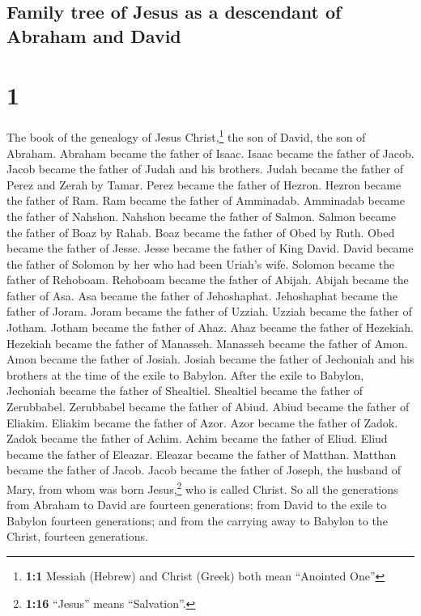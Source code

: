 \hypertarget{family-tree-of-jesus-as-a-descendant-of-abraham-and-david}{%
\subsection{Family tree of Jesus as a descendant of Abraham and
David}\label{family-tree-of-jesus-as-a-descendant-of-abraham-and-david}}

\hypertarget{section}{%
\section{1}\label{section}}

 The book of the genealogy of Jesus Christ,\footnote{\textbf{1:1}
  Messiah (Hebrew) and Christ (Greek) both mean ``Anointed One''} the
son of David, the son of Abraham.  Abraham became the
father of Isaac. Isaac became the father of Jacob. Jacob became the
father of Judah and his brothers.  Judah became the father
of Perez and Zerah by Tamar. Perez became the father of Hezron. Hezron
became the father of Ram.  Ram became the father of
Amminadab. Amminadab became the father of Nahshon. Nahshon became the
father of Salmon.  Salmon became the father of Boaz by
Rahab. Boaz became the father of Obed by Ruth. Obed became the father of
Jesse.  Jesse became the father of King David. David
became the father of Solomon by her who had been Uriah's wife.
 Solomon became the father of Rehoboam. Rehoboam became
the father of Abijah. Abijah became the father of Asa. 
Asa became the father of Jehoshaphat. Jehoshaphat became the father of
Joram. Joram became the father of Uzziah.  Uzziah became
the father of Jotham. Jotham became the father of Ahaz. Ahaz became the
father of Hezekiah.  Hezekiah became the father of
Manasseh. Manasseh became the father of Amon. Amon became the father of
Josiah.  Josiah became the father of Jechoniah and his
brothers at the time of the exile to Babylon.  After the
exile to Babylon, Jechoniah became the father of Shealtiel. Shealtiel
became the father of Zerubbabel.  Zerubbabel became the
father of Abiud. Abiud became the father of Eliakim. Eliakim became the
father of Azor.  Azor became the father of Zadok. Zadok
became the father of Achim. Achim became the father of Eliud.
 Eliud became the father of Eleazar. Eleazar became the
father of Matthan. Matthan became the father of Jacob. 
Jacob became the father of Joseph, the husband of Mary, from whom was
born Jesus,\footnote{\textbf{1:16} ``Jesus'' means ``Salvation''.} who
is called Christ.  So all the generations from Abraham to
David are fourteen generations; from David to the exile to Babylon
fourteen generations; and from the carrying away to Babylon to the
Christ, fourteen generations.

